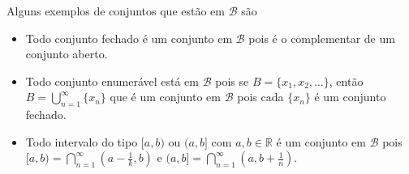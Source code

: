 \documentclass[a4paper, 11pt]{book}
\theoremstyle{definition}
\newcommand{\bN}{\mathbb{N}}
\newcommand{\bR}{\mathbb{R}}
\newcommand{\cB}{\mathcal{B}}
\begin{document}
\begin{prf}




\end{prf}

\begin{ex}
    Alguns exemplos de conjuntos que estão em $\cB$ são
    \begin{itemize}
        \item Todo conjunto fechado é um conjunto em $\cB$ pois é o complementar de um conjunto aberto.
        \item Todo conjunto enumerável está em $\cB$ pois se $B = \{x_1,x_2,\dots\}$, então $B = \bigcup_{n=1}^\infty \{x_n\}$ que é um conjunto em $\cB$ pois cada $\{x_n\}$ é um conjunto fechado.
        \item Todo intervalo do tipo $[a,b)$ ou $(a,b]$ com $a,b \in \bR$ é um conjunto em $\cB$ pois $[a,b) = \bigcap_{n=1}^\infty (a- \frac{1}{k}, b)$ e $(a,b] = \bigcap_{n=1}^\infty (a, b + \frac{1}{n})$.
    \end{itemize}
\end{ex}
\end{document}
